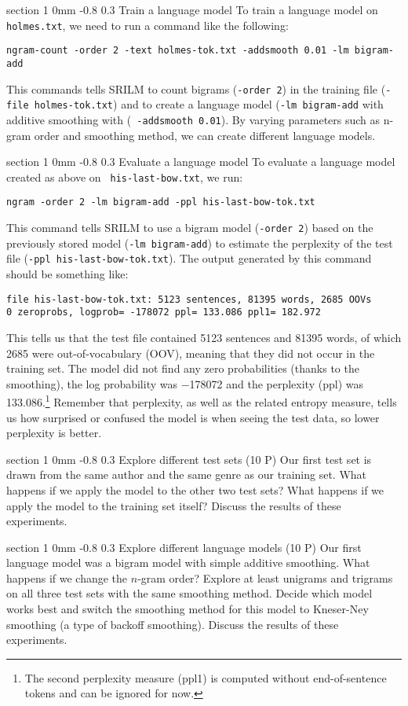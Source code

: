 \documentclass[11pt]{article}
\makeatletter
\newcommand{\newsec}[2]{\section{#1}\label{sec:#2}\noindent}
\renewcommand{\section}{\@startsection
{section}%
{1}%
{0mm}%
{-0.8\baselineskip}%
{0.3\baselineskip}%
{\bfseries\large}}%
\makeatother
\begin{document}
\newsec{Train a language model}{train}%
To train a language model on {\tt holmes.txt}, we need to run a
command like the following:
\begin{verbatim}
ngram-count -order 2 -text holmes-tok.txt -addsmooth 0.01 -lm bigram-add
\end{verbatim}
This commands tells SRILM to count bigrams ({\tt -order\,2}) in the
training file ({\tt -file\,holmes-tok.txt}) and to create a language
model ({\tt -lm\,bigram-add} with additive smoothing with ({\tt
  -addsmooth\,0.01}).  By varying parameters such as n-gram order and
smoothing method, we can create different language models.

\newsec{Evaluate a language model}{eval}%
To evaluate a language model created as above on {\tt
  his-last-bow.txt}, we run:
\begin{verbatim}
ngram -order 2 -lm bigram-add -ppl his-last-bow-tok.txt
\end{verbatim}
This command tells SRILM to use a bigram model ({\tt -order\,2}) based
on the previously stored model ({\tt -lm\,bigram-add}) to estimate the
perplexity of the test file ({\tt -ppl\,his-last-bow-tok.txt}). The
output generated by this command should be something like:
\begin{verbatim}
file his-last-bow-tok.txt: 5123 sentences, 81395 words, 2685 OOVs
0 zeroprobs, logprob= -178072 ppl= 133.086 ppl1= 182.972
\end{verbatim}
This tells us that the test file contained 5123 sentences and 81395
words, of which 2685 were out-of-vocabulary (OOV), meaning that they
did not occur in the training set. The model did not find any zero
probabilities (thanks to the smoothing), the log probability was
$-$178072 and the perplexity (ppl) was 133.086.\footnote{The second
  perplexity measure (ppl1) is computed without end-of-sentence tokens
  and can be ignored for now.} Remember that perplexity, as well as
the related entropy measure, tells us how surprised or confused the
model is when seeing the test data, so lower perplexity is better.

\newsec{Explore different test sets (10 P)}{sets}%
Our first test set is drawn from the same author and the same genre as
our training set. What happens if we apply the model to the other two
test sets? What happens if we apply the model to the training set
itself? Discuss the results of these experiments.

\newsec{Explore different language models (10 P)}{models}%
Our first language model was a bigram model with simple additive
smoothing. What happens if we change the $n$-gram order?  Explore at
least unigrams and trigrams on all three test sets with the same
smoothing method. Decide which model works best and switch the
smoothing method for this model to Kneser-Ney smoothing (a type of
backoff smoothing). Discuss the results of these experiments.
\end{document}
